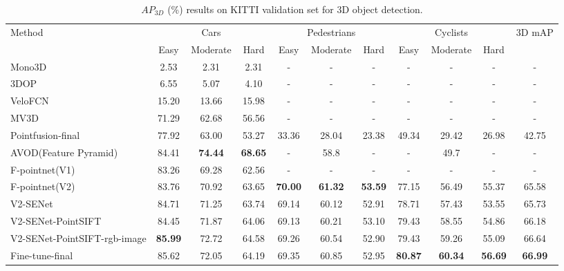 \documentclass[letterpaper]{article} %
\begin{document}
\begin{table}[h]
\scriptsize
\centering
\begin{tabular}{l|c|c|c|c|c|c|c|c|c|c}
\hline
\multirow{2}{*}{Method} & \multicolumn{3}{c|}{Cars} &
\multicolumn{3}{c|}{Pedestrians} & \multicolumn{3}{c|}{Cyclists} & \multicolumn{1}{c}{\multirow{2}{*}{3D mAP}} \\
\cline{2-10}

& Easy & Moderate & Hard & Easy & Moderate & Hard & Easy & Moderate & Hard & \multicolumn{1}{c}{} \\
\hline
\hline
Mono3D~\cite{chen2016monocular} &2.53 &2.31 &2.31 &- &- &- &- &- &- &- \\
3DOP~\cite{chen20153d}   &6.55 &5.07 &4.10 &- &- &- &- &- &- &- \\
VeloFCN~\cite{li20173d}	 		            & 15.20 & 13.66 & 15.98 & - & - & - & -  & - & - & - \\
MV3D~\cite{chen2017multi} 	                    & 71.29 & 62.68 & 56.56 & - & - & - & -  & - & - & - \\
Pointfusion-final~\cite{xu2017pointfusion}  			& 77.92 & 63.00 & 53.27 & 33.36 & 28.04 & 23.38 & 49.34  & 29.42 & 26.98 & 42.75\\
AVOD(Feature Pyramid)~\cite{ku2018joint}   &84.41  &\textbf{74.44}  &\textbf{68.65}   &-  &58.8  &-  &- &49.7 &-  &-\\
F-pointnet(V1)~\cite{qi2017frustum}				    & 83.26 & 69.28 & 62.56 & - & - & - & -  & - & - & -\\
F-pointnet(V2)~\cite{qi2017frustum}	 			    & 83.76 & 70.92 & 63.65 & \textbf{70.00} & \textbf{61.32} & \textbf{53.59} & 77.15  & 56.49 & 55.37 & 65.58\\
\hline
V2-SENet			        & 84.71 & 71.25 & 63.74 & 69.14 & 60.12 & 52.91 & 78.71  & 57.43 & 53.55 & 65.73\\
V2-SENet-PointSIFT			& 84.45 & 71.87 & 64.06 & 69.13 & 60.21 & 53.10 & 79.43  & 58.55 & 54.86 & 66.18\\
V2-SENet-PointSIFT-rgb-image   &\textbf{85.99} &72.72 &64.58 &69.26 &60.54 &52.90 &79.43 &59.26 &55.09 &66.64 \\
Fine-tune-final 	& 85.62 &72.05 &64.19 & 69.35 & 60.85
                & 52.95 & \textbf{80.87}  & \textbf{60.34} & \textbf{56.69} & \textbf{66.99}\\
\hline
\end{tabular}
\caption{$AP_{3D}$ (\%) results on KITTI validation set for 3D object detection.}
\label{T1}
\end{table}
\end{document}
